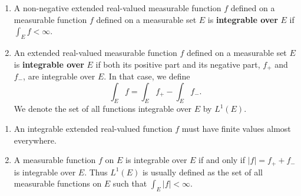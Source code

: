 \begin{defn}%
	\begin{enumerate}
	\item A non-negative extended real-valued measurable function $f$ defined on a 
	measurable function $f$ defined on a measurable set $E$ is \textbf{integrable over} 
	$E$ if $\int_Ef<\infty$. 
	\item An extended real-valued measurable function $f$ defined on a measurable 
	set $E$ is \textbf{integrable over} $E$ if both its positive part and its 
	negative part, $f_+$ and $f_-$, are integrable over $E$. In that case, we define 
	\begin{equation*}
		\int_E f = \int_Ef_+-\int_Ef_-.
	\end{equation*}
	We denote the set of all functions integrable over $E$ by $L^1(E)$. 
	\end{enumerate}
\end{defn}

\begin{rmk}%
\begin{enumerate}
	\item An integrable extended real-valued function $f$ must have finite values 
	almost everywhere. 
	\item A measurable function $f$ on $E$ is integrable over $E$ if and only if 
	$|f| = f_++f_-$ is integrable over $E$. Thus $L^1(E)$ is usually defined as the 
	set of all measurable functions on $E$ such that $\int_E|f|<\infty$. 
\end{enumerate}
\end{rmk}

